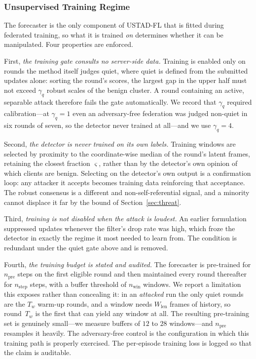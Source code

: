 \documentclass[journal]{IEEEtran}
\begin{document}
\subsubsection{Unsupervised Training Regime}
\label{sec:training_regime}
The forecaster is the only component of USTAD-FL that is fitted during federated training, so what it is trained \emph{on} determines whether it can be manipulated. Four properties are enforced.

First, \emph{the training gate consults no server-side data.} Training is enabled only on rounds the method itself judges quiet, where quiet is defined from the submitted updates alone: sorting the round's scores, the largest gap in the upper half must not exceed $\gamma_q$ robust scales of the benign cluster. A round containing an active, separable attack therefore fails the gate automatically. We record that $\gamma_q$ required calibration---at $\gamma_q = 1$ even an adversary-free federation was judged non-quiet in six rounds of seven, so the detector never trained at all---and we use $\gamma_q = 4$.

Second, \emph{the detector is never trained on its own labels.} Training windows are selected by proximity to the coordinate-wise median of the round's latent frames, retaining the closest fraction $\varsigma$, rather than by the detector's own opinion of which clients are benign. Selecting on the detector's own output is a confirmation loop: any attacker it accepts becomes training data reinforcing that acceptance. The robust consensus is a different and non-self-referential signal, and a minority cannot displace it far by the bound of Section~\ref{sec:threat}.

Third, \emph{training is not disabled when the attack is loudest.} An earlier formulation suppressed updates whenever the filter's drop rate was high, which froze the detector in exactly the regime it most needed to learn from. The condition is redundant under the quiet gate above and is removed.

Fourth, \emph{the training budget is stated and audited.} The forecaster is pre-trained for $n_{\mathrm{pre}}$ steps on the first eligible round and then maintained every round thereafter for $n_{\mathrm{step}}$ steps, with a buffer threshold of $n_{\mathrm{win}}$ windows. We report a limitation this exposes rather than concealing it: in an \emph{attacked} run the only quiet rounds are the $T_w$ warm-up rounds, and a window needs $W_{\mathrm{len}}$ frames of history, so round~$T_w$ is the first that can yield any window at all. The resulting pre-training set is genuinely small---we measure buffers of $12$ to $28$ windows---and $n_{\mathrm{pre}}$ resamples it heavily. The adversary-free control is the configuration in which this training path is properly exercised. The per-episode training loss is logged so that the claim is auditable.
\end{document}
